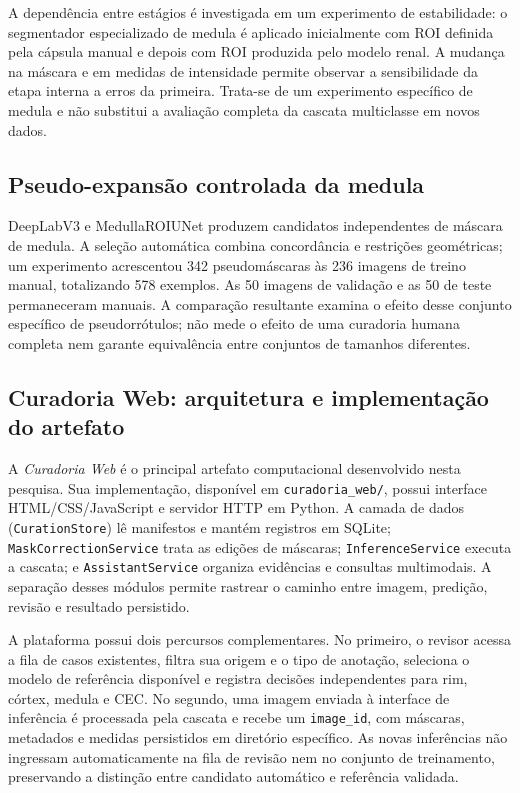 \documentclass[12pt]{article}
\begin{document}
A dependência entre estágios é investigada em um experimento de estabilidade: o segmentador especializado de medula é aplicado inicialmente com ROI definida pela cápsula manual e depois com ROI produzida pelo modelo renal. A mudança na máscara e em medidas de intensidade permite observar a sensibilidade da etapa interna a erros da primeira. Trata-se de um experimento específico de medula e não substitui a avaliação completa da cascata multiclasse em novos dados.

\subsection{Pseudo-expansão controlada da medula}

DeepLabV3 e MedullaROIUNet produzem candidatos independentes de máscara de medula. A seleção automática combina concordância e restrições geométricas; um experimento acrescentou 342 pseudomáscaras às 236 imagens de treino manual, totalizando 578 exemplos. As 50 imagens de validação e as 50 de teste permaneceram manuais. A comparação resultante examina o efeito desse conjunto específico de pseudorrótulos; não mede o efeito de uma curadoria humana completa nem garante equivalência entre conjuntos de tamanhos diferentes.

\subsection{Curadoria Web: arquitetura e implementação do artefato}

A \textit{Curadoria Web} é o principal artefato computacional desenvolvido nesta pesquisa. Sua implementação, disponível em \texttt{curadoria\_web/}, possui interface HTML/CSS/JavaScript e servidor HTTP em Python. A camada de dados (\texttt{CurationStore}) lê manifestos e mantém registros em SQLite; \texttt{MaskCorrectionService} trata as edições de máscaras; \texttt{InferenceService} executa a cascata; e \texttt{AssistantService} organiza evidências e consultas multimodais. A separação desses módulos permite rastrear o caminho entre imagem, predição, revisão e resultado persistido.

A plataforma possui dois percursos complementares. No primeiro, o revisor acessa a fila de casos existentes, filtra sua origem e o tipo de anotação, seleciona o modelo de referência disponível e registra decisões independentes para rim, córtex, medula e CEC. No segundo, uma imagem enviada à interface de inferência é processada pela cascata e recebe um \texttt{image\_id}, com máscaras, metadados e medidas persistidos em diretório específico. As novas inferências não ingressam automaticamente na fila de revisão nem no conjunto de treinamento, preservando a distinção entre candidato automático e referência validada.
\end{document}
